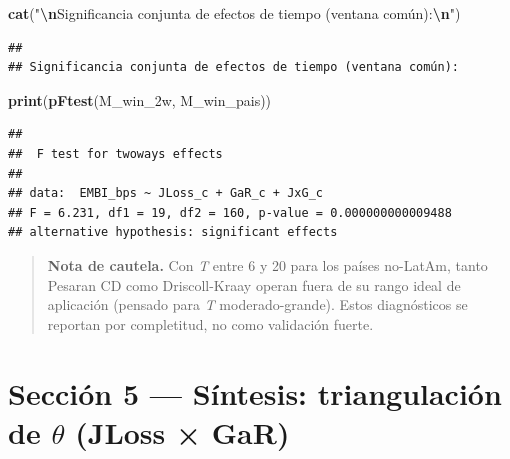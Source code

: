 \documentclass[
]{article}
\newenvironment{Shaded}{\begin{snugshade}}{\end{snugshade}}
\newcommand{\FunctionTok}[1]{\textcolor[rgb]{0.13,0.29,0.53}{\textbf{#1}}}
\newcommand{\NormalTok}[1]{#1}
\newcommand{\SpecialCharTok}[1]{\textcolor[rgb]{0.81,0.36,0.00}{\textbf{#1}}}
\newcommand{\StringTok}[1]{\textcolor[rgb]{0.31,0.60,0.02}{#1}}
\begin{document}
\begin{Shaded}
\begin{Highlighting}[]
\FunctionTok{cat}\NormalTok{(}\StringTok{"}\SpecialCharTok{\textbackslash{}n}\StringTok{Significancia conjunta de efectos de tiempo (ventana común):}\SpecialCharTok{\textbackslash{}n}\StringTok{"}\NormalTok{)}
\end{Highlighting}
\end{Shaded}

\begin{verbatim}
## 
## Significancia conjunta de efectos de tiempo (ventana común):
\end{verbatim}

\begin{Shaded}
\begin{Highlighting}[]
\FunctionTok{print}\NormalTok{(}\FunctionTok{pFtest}\NormalTok{(M\_win\_2w, M\_win\_pais))}
\end{Highlighting}
\end{Shaded}

\begin{verbatim}
## 
##  F test for twoways effects
## 
## data:  EMBI_bps ~ JLoss_c + GaR_c + JxG_c
## F = 6.231, df1 = 19, df2 = 160, p-value = 0.000000000009488
## alternative hypothesis: significant effects
\end{verbatim}

\begin{quote}
\textbf{Nota de cautela.} Con \emph{T} entre 6 y 20 para los países
no-LatAm, tanto Pesaran CD como Driscoll-Kraay operan fuera de su rango
ideal de aplicación (pensado para \emph{T} moderado-grande). Estos
diagnósticos se reportan por completitud, no como validación fuerte.
\end{quote}

\section{\texorpdfstring{Sección 5 --- Síntesis: triangulación de
\(\theta\) (JLoss ×
GaR)}{Sección 5 --- Síntesis: triangulación de \textbackslash theta (JLoss × GaR)}}\label{secciuxf3n-5-suxedntesis-triangulaciuxf3n-de-theta-jloss-gar}
\end{document}
